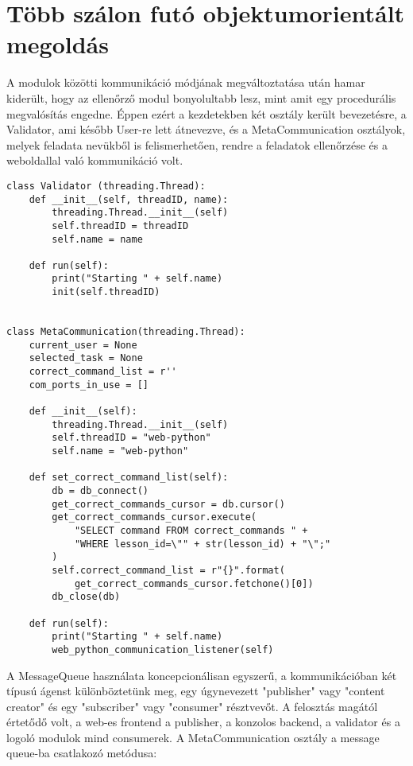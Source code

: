 \documentclass[12pt]{report}
\begin{document}
\section{Több szálon futó objektumorientált megoldás}


A modulok közötti kommunikáció módjának megváltoztatása után hamar kiderült, hogy az ellenőrző modul bonyolultabb lesz, mint amit egy procedurális megvalósítás engedne. Éppen ezért a kezdetekben két osztály került bevezetésre, a Validator, ami később User-re lett átnevezve, és a MetaCommunication osztályok, melyek feladata nevükből is felismerhetően, rendre a feladatok ellenőrzése és a weboldallal való kommunikáció volt.

\begin{verbatim}
class Validator (threading.Thread):
    def __init__(self, threadID, name):
        threading.Thread.__init__(self)
        self.threadID = threadID
        self.name = name

    def run(self):
        print("Starting " + self.name)
        init(self.threadID)


class MetaCommunication(threading.Thread):
    current_user = None
    selected_task = None
    correct_command_list = r''
    com_ports_in_use = []

    def __init__(self):
        threading.Thread.__init__(self)
        self.threadID = "web-python"
        self.name = "web-python"

    def set_correct_command_list(self):
        db = db_connect()
        get_correct_commands_cursor = db.cursor()
        get_correct_commands_cursor.execute(
            "SELECT command FROM correct_commands " +
            "WHERE lesson_id=\"" + str(lesson_id) + "\";"
        )
        self.correct_command_list = r"{}".format(
            get_correct_commands_cursor.fetchone()[0])
        db_close(db)

    def run(self):
        print("Starting " + self.name)
        web_python_communication_listener(self)
\end{verbatim}

A MessageQueue használata koncepcionálisan egyszerű, a kommunikációban két típusú ágenst különböztetünk meg, egy úgynevezett "publisher" vagy "content creator" és egy "subscriber" vagy "consumer" résztvevőt. A felosztás magától értetődő volt, a web-es frontend a publisher, a konzolos backend, a validator és a logoló modulok mind consumerek. A MetaCommunication osztály a message queue-ba csatlakozó metódusa:
\end{document}
